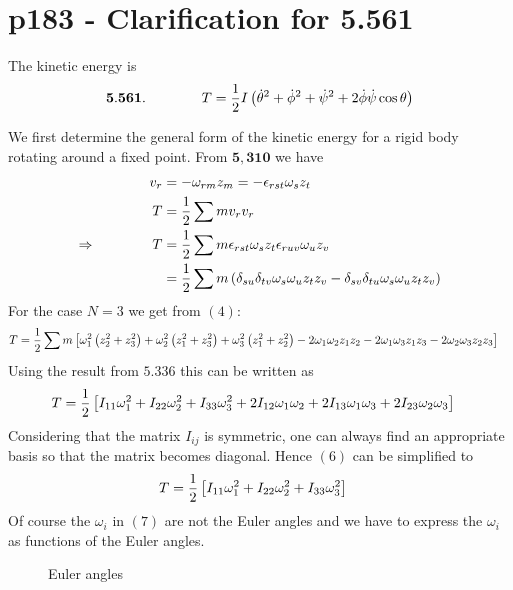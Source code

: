 \section{p183 - Clarification for 5.561}
\begin{tcolorbox}
The kinetic energy is 
$$\mathbf{5.561.}\quad\quad\quad\quad T=\frac{1}{2} I\left(\dot{\theta}^2+\dot{\phi}^2+\dot{\psi}^2+2\dot{\phi}\dot{\psi}\cos{\theta} \right)$$ 
\end{tcolorbox}
We first determine the general form of the kinetic energy for a rigid body rotating around a fixed point.
From $\mathbf{5,310}$ we have
\begin{align}
v_r&= - \omega_{rm}z_m= -\epsilon_{rst}\omega_s z_t\\
T&= \frac{1}{2}\sum m v_r v_r\\
\Rightarrow\quad\quad\quad\quad T&= \frac{1}{2}\sum m \epsilon_{rst}\omega_s z_t\epsilon_{ruv}\omega_u z_v\\
&=\frac{1}{2} \sum m \left(\delta_{su}\delta_{tv}\omega_s \omega_u z_tz_v - \delta_{sv}\delta_{tu}\omega_s \omega_u z_tz_v  \right)
\end{align}
For the case $N=3$ we get from $(4)$:
\begin{align}
T&= \frac{1}{2}\sum m  \left[ \omega_1^2 \left( z_2^2+z_3^2 \right)+\omega_2^2\left( z_1^2+z_3^2 \right)+\omega_3^2 \left( z_1^2+z_2^2 \right)
-2\omega_1 \omega_2 z_1 z_2 -2\omega_1 \omega_3 z_1 z_3 -2\omega_2 \omega_3 z_2 z_3 \right]
\end{align}
Using the result from $\mathbf{5.336}$ this can be written as 
\begin{align}
T&= \frac{1}{2} \left[ I_{11}\omega_1^2 +I_{22}\omega_2^2+I_{33}\omega_3^2 
+2I_{12}\omega_1 \omega_2+2I_{13}\omega_1 \omega_3 +2I_{23}\omega_2 \omega_3  \right]
\end{align}
Considering that the matrix $I_{ij}$ is symmetric, one can always find an appropriate basis so that the matrix becomes diagonal. Hence $(6)$ can be simplified to
\begin{align}
T&= \frac{1}{2} \left[ I_{11}\omega_1^2 +I_{22}\omega_2^2+I_{33}\omega_3^2 
 \right]
\end{align}
Of course the $\omega_i$ in $(7)$ are not the Euler angles and we have to express the $\omega_i$ as functions of the Euler angles.

\begin{figure}[H]
\begin{center}

\caption{Euler angles}
\label{fig:fig_p183_5.561}
\end{center}
\end{figure}

